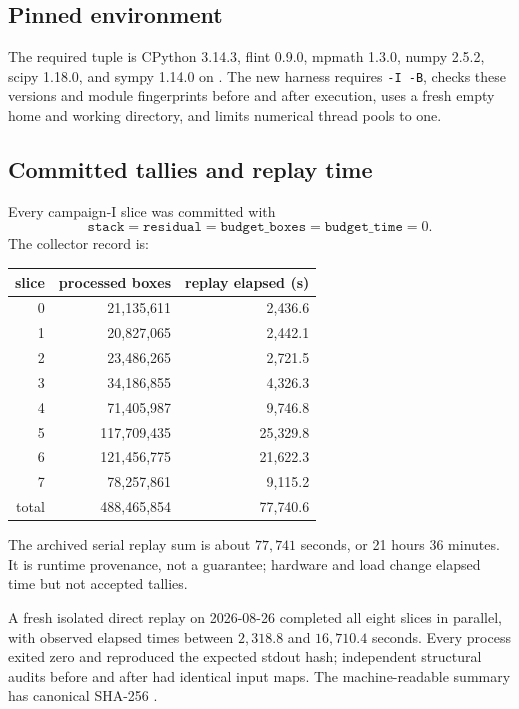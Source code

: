 \documentclass[11pt]{article}
\theoremstyle{plain}
\theoremstyle{definition}
\theoremstyle{remark}
\begin{document}
\subsection{Pinned environment}
The required tuple is CPython 3.14.3, flint 0.9.0, mpmath 1.3.0,
numpy 2.5.2, scipy 1.18.0, and sympy 1.14.0 on
.  The new harness requires
\texttt{-I -B}, checks these versions and module fingerprints before and after
execution, uses a fresh empty home and working directory, and limits numerical
thread pools to one.

\subsection{Committed tallies and replay time}
Every campaign-I slice was committed with
\[
\texttt{stack}=\texttt{residual}=\texttt{budget\_boxes}
=\texttt{budget\_time}=0.
\]
The collector record is:
\begin{center}
\small
\begin{tabular}{r r r}
\hline
slice & processed boxes & replay elapsed (s)\\
\hline
0 & 21{,}135{,}611 & 2{,}436.6\\
1 & 20{,}827{,}065 & 2{,}442.1\\
2 & 23{,}486{,}265 & 2{,}721.5\\
3 & 34{,}186{,}855 & 4{,}326.3\\
4 & 71{,}405{,}987 & 9{,}746.8\\
5 & 117{,}709{,}435 & 25{,}329.8\\
6 & 121{,}456{,}775 & 21{,}622.3\\
7 & 78{,}257{,}861 & 9{,}115.2\\
\hline
total & 488{,}465{,}854 & 77{,}740.6\\
\hline
\end{tabular}
\end{center}
The archived serial replay sum is about $77{,}741$ seconds, or 21 hours
36 minutes.  It is runtime provenance, not a guarantee; hardware and load
change elapsed time but not accepted tallies.

A fresh isolated direct replay on 2026-08-26 completed all eight slices in
parallel, with observed elapsed times between \(2{,}318.8\) and
\(16{,}710.4\) seconds.  Every process exited zero and reproduced the expected
stdout hash; independent structural audits before and after had identical
input maps.  The machine-readable summary has canonical SHA-256
.
\end{document}
